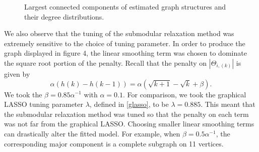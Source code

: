 \documentclass{uwstat572}
\theoremstyle{remark}
\theoremstyle{definition}
\begin{document}
\begin{figure}
\centering
{}

\centering
{}



\caption{Largest connected components of estimated graph structures and their degree distributions.}
\label{graphs}
\end{figure}
We also observe that the tuning of the submodular relaxation method was extremely sensitive to the choice of tuning parameter.  In order to produce the graph displayed in figure 4, the linear smoothing term was chosen to dominate the square root portion of the penalty.  Recall that the penalty on $|\Theta_{i,(k)}|$ is given by
\begin{equation*}
    \alpha \left( h(k) - h(k-1) \right) = \alpha \left( \sqrt{k+1} - \sqrt{k} + \beta \right).
\end{equation*}
We took the $\beta = 0.85 \alpha^{-1}$ with $\alpha = 0.1$.  For comparison, we took the graphical LASSO tuning parameter $\lambda$, defined in \eqref{glasso}, to be $\lambda = 0.885$.  This meant that the submodular relaxation method was tuned so that the penalty on each term was not far from the graphical LASSO. Choosing smaller linear smoothing terms can drastically alter the fitted model.  For example, when $\beta = 0.5\alpha^{-1}$, the corresponding major component is a complete subgraph on 11 vertices.
\end{document}
